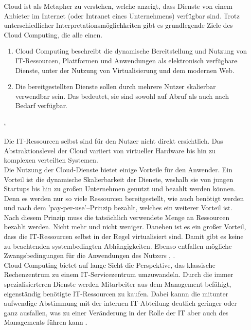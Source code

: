 Cloud ist als Metapher zu verstehen, welche anzeigt, dass Dienste von einem Anbieter
im Internet (oder Intranet eines Unternehmens) verfügbar sind. Trotz unterschiedlicher
Interpretationsmöglichkeiten gibt es grundlegende Ziele des Cloud Computing,
die alle einen.
\begin{enumerate}
  \item Cloud Computing beschreibt die dynamische Bereitstellung und Nutzung von IT-Ressourcen,
  Plattformen und Anwendungen als elektronisch verfügbare Dienste, unter der Nutzung
  von Virtualisierung und dem modernen Web.
  \item Die bereitgestellten Dienste sollen durch mehrere Nutzer skalierbar verwendbar
  sein. Das bedeutet, sie sind sowohl auf Abruf als auch nach Bedarf verfügbar.
\end{enumerate}
\cite{baun:springer}, \cite{wittig:manning}
\\
\\
Die IT-Ressourcen selbst sind für den Nutzer nicht direkt ersichtlich. Das
Abstraktionslevel der Cloud variiert von virtueller Hardware bis hin zu komplexen verteilten Systemen.
\\ Die Nutzung der Cloud-Dienste bietet einige Vorteile für den Anwender. Ein Vorteil
ist die dynamische Skalierbarkeit der Dienste, weshalb
sie von jungen Startups bis hin zu großen Unternehmen genutzt und bezahlt werden
können. Denn es werden nur so viele Ressourcen bereitgestellt, wie auch benötigt werden
und nach dem 'pay-per-use'--Prinzip bezahlt, welches ein weiterer Vorteil ist.
Nach diesem Prinzip muss die tatsächlich verwendete Menge an Ressourcen bezahlt werden.
Nicht mehr und nicht weniger. Daneben ist es ein großer Vorteil, dass die IT-Ressourcen
selbst in der Regel virtualisiert sind. Damit gibt es keine zu beachtenden systembedingten
Abhängigkeiten. Ebenso entfallen mögliche Zwangsbedingungen für die Anwendungen des Nutzers
\cite{baun:springer}, \cite{wittig:manning}.
\\ Cloud Computing bietet auf lange Sicht die Perspektive, das klassische Rechenzentrum zu einem
IT-Servicezentrum umzuwandeln. Durch die immer spezialisierteren Dienste werden
Mitarbeiter aus dem Management befähigt, eigenständig benötigte IT-Ressourcen zu kaufen.
Dabei kannn die mitunter aufwendige Abstimmung mit der internen IT-Abteilung deutlich
geringer oder ganz ausfallen,
was zu einer Veränderung in der Rolle der IT aber auch des Managements führen kann \cite{baun:springer}.

